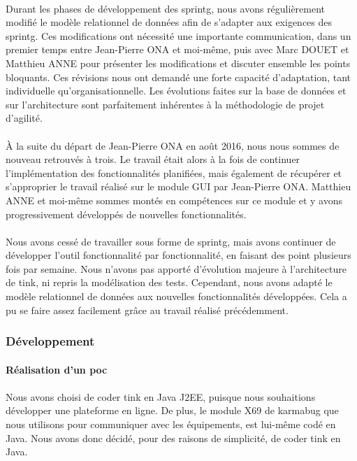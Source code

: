 \documentclass[12pt,a4paper]{report}
\begin{document}
\paragraph*{}Durant les phases de développement des \gls{sprintg}, nous avons régulièrement modifié le modèle relationnel de données afin de s’adapter aux exigences des \gls{sprintg}. Ces modifications ont nécessité une importante communication, dans un premier temps entre Jean-Pierre ONA et moi-même, puis avec Marc DOUET et Matthieu ANNE pour présenter les modifications et discuter ensemble les points bloquants. Ces révisions nous ont demandé une forte capacité d’adaptation, tant individuelle qu’organisationnelle. Les évolutions faites sur la base de données et sur l'architecture sont parfaitement inhérentes à la méthodologie de projet d’agilité.
\paragraph*{}À la suite du départ de Jean-Pierre ONA en août 2016, nous nous sommes de nouveau retrouvés à trois. Le travail était alors à la fois de continuer l'implémentation des fonctionnalités planifiées, mais également de récupérer et s'approprier le travail réalisé sur le module GUI par Jean-Pierre ONA. Matthieu ANNE et moi-même sommes montés en compétences sur ce module et y avons progressivement développés de nouvelles fonctionnalités.
\paragraph*{}Nous avons cessé de travailler sous forme de \gls{sprintg}, mais avons continuer de développer l'outil fonctionnalité par fonctionnalité, en faisant des point plusieurs fois par semaine. Nous n'avons pas apporté d'évolution majeure à l'architecture de \gls{tink}, ni repris la modélisation des tests. Cependant, nous avons adapté le modèle relationnel de données aux nouvelles fonctionnalités développées. Cela a pu se faire assez facilement grâce au travail réalisé précédemment. \\

\subsubsection{Développement}
\paragraph{Réalisation d'un \gls{poc}}
\paragraph*{}Nous avons choisi de coder \gls{tink} en Java J2EE, puisque nous souhaitions développer une plateforme en ligne. De plus, le module X69 de \gls{karmabug} que nous utilisons pour communiquer avec les équipements, est lui-même codé en Java. Nous avons donc décidé, pour des raisons de simplicité, de coder \gls{tink} en Java.
\end{document}
